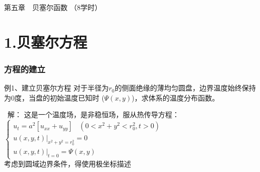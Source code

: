 \begin{frame}
	\frametitle{}
	\Background[1] 
	\begin{center}
	{ {\Huge 第五章~~贝塞尔函数 （8学时）}}
	\end{center}    
\end{frame}

\section{1.贝塞尔方程}

\begin{frame}
	\frametitle{方程的建立}
	\begin{exampleblock} {例1、建立贝塞尔方程}
		对于半径为$r_0$的侧面绝缘的薄均匀圆盘，边界温度始终保持为0度，当盘的初始温度已知时 ($\Psi(x,y)$)，求体系的温度分布函数。
    \end{exampleblock}
	\begin{center}
	\end{center}
\end{frame}	

\begin{frame}
	\alert{ 解：}	这是一个温度场，是非稳恒场，服从热传导方程：\\
	$\begin{cases}
		u_t=a^2 [u_{xx}   +u_{yy}] ~~~~ (0< x^2 +y^2 <r_0 ^2, t>0)\\
		u(x,y,t)|_{x^2+y^2=r_0 ^2}= 0 \\
		u(x,y,t)|_{t=0}= \Psi(x,y)
	\end{cases} $\\	\vspace{0.6em}
	考虑到圆域边界条件，得使用极坐标描述\\
\end{frame}

